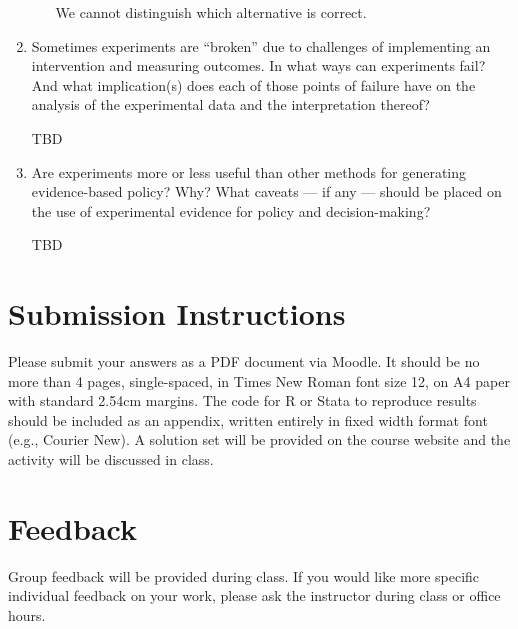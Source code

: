 \documentclass[a4paper,12pt]{exam}
\begin{document}
\begin{enumerate}
\begin{enumerate}
\begin{solution}
	We cannot distinguish which alternative is correct.
	
	\end{solution}
	
	\end{enumerate}

\item Sometimes experiments are ``broken'' due to challenges of implementing an intervention and measuring outcomes. In what ways can experiments fail? And what implication(s) does each of those points of failure have on the analysis of the experimental data and the interpretation thereof?

\begin{solution}
TBD
\end{solution}

\item Are experiments more or less useful than other methods for generating evidence-based policy? Why? What caveats --- if any --- should be placed on the use of experimental evidence for policy and decision-making?

\begin{solution}
TBD
\end{solution}

\end{enumerate}

\section{Submission Instructions}\label{submission-instructions}

Please submit your answers as a PDF document via Moodle. It should be no more than 4 pages, single-spaced, in Times New Roman font size 12, on A4 paper with standard 2.54cm margins. The code for R or Stata to reproduce results should be included as an appendix, written entirely in fixed width format font (e.g., Courier New). A solution set will be provided on the course website and the activity will be discussed in class.

\section{Feedback}\label{feedback}

Group feedback will be provided during class. If you would like more specific individual feedback on your work, please ask the instructor during class or office hours.
\end{document}

